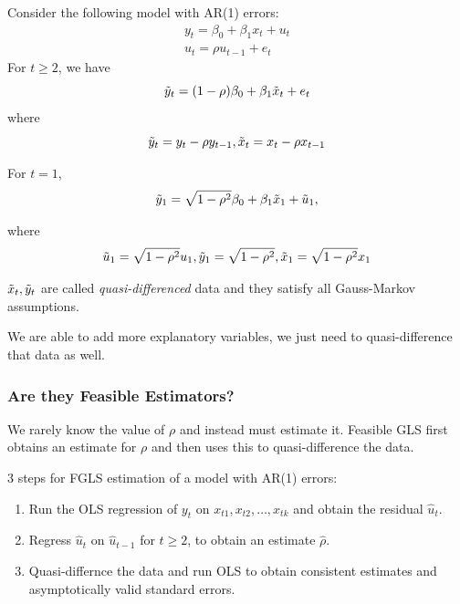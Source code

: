 \documentclass[11pt]{article}
\begin{document}
\begin{shaded}
    Consider the following model with AR(1) errors:
    \begin{gather*}
        y_t = \beta_0 + \beta_1 x_t + u_t \\
        u_t = \rho u_{t-1} + e_t
    \end{gather*}
    For $t\geq 2$, we have
    \begin{equation}
        \label{quasi difference t 2}
        \Tilde{y}_t = (1-\rho) \beta_0 + \beta_1 \Tilde{x}_t + e_t
    \end{equation}
    where 
    \[\Tilde{y}_t = y_t - \rho y_{t-1}, \Tilde{x}_t = x_t - \rho x_{t-1}\]

    For $t=1$, 
    \begin{equation}
        \label{quasi difference t 1}
        \Tilde{y}_1 = \sqrt{1-\rho^2} \beta_0 + \beta_1 \Tilde{x}_1 + \Tilde{u}_1,
    \end{equation}

    where
    \[\Tilde{u}_1 = \sqrt{1-\rho^2} u_1, \Tilde{y}_1 = \sqrt{1-\rho^2}, \Tilde{x}_1 = \sqrt{1-\rho^2}x_1\]

    $\Tilde{x}_t, \Tilde{y}_t$ are called \textit{quasi-differenced} data and they satisfy all Gauss-Markov assumptions.

    \begin{note}
        We are able to add more explanatory variables, we just need to quasi-difference that data as well.
    \end{note}
\end{shaded}

\subsubsection{Are they Feasible Estimators?}

We rarely know the value of $\rho$ and instead must estimate it. Feasible GLS first obtains an estimate for $\rho$ and then uses this to quasi-difference the data.

\begin{mdframed}
    3 steps for FGLS estimation of a model with AR(1) errors:
    \begin{enumerate}
        \item Run the OLS regression of $y_t$ on $x_{t1}, x_{t2}, \ldots, x_{tk}$ and obtain the residual $\hat{u}_t$.

        \item Regress $\hat{u}_t$ on $\hat{u}_{t-1}$ for $t\geq 2$, to obtain an estimate $\hat{\rho}$.

        \item Quasi-differnce the data and run OLS to obtain consistent estimates and asymptotically valid standard errors.
    \end{enumerate}
\end{mdframed}
\end{document}
